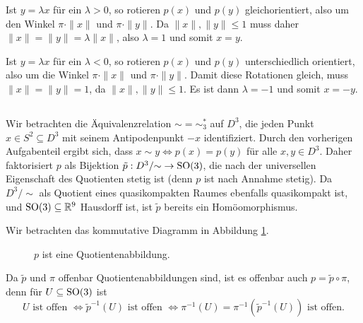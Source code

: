 \documentclass[a4paper,10pt]{article}
\begin{document}
Ist $y = \lambda x$ für ein $\lambda > 0$, so rotieren $p(x)$ und $p(y)$ gleichorientiert, also um den Winkel $\pi \cdot \|x\|$ und $\pi \cdot \|y\|$. Da $\|x\|, \|y\| \leq 1$ muss daher $\|x\| = \|y\| = \lambda \|x\|$, also $\lambda = 1$ und somit $x = y$.

Ist $y = \lambda x$ für ein $\lambda < 0$, so rotieren $p(x)$ und $p(y)$ unterschiedlich orientiert, also um die Winkel $\pi \cdot \|x\|$ und $\pi \cdot \|y\|$. Damit diese Rotationen gleich, muss $\|x\| = \|y\| = 1$, da $\|x\|,\|y\| \leq 1$. Es ist dann $\lambda = -1$ und somit $x = -y$.


\addtocounter{subsection}{-2}
\subsection{}
Wir betrachten die Äquivalenzrelation ${\sim}={\sim^*_3}$ auf $D^3$, die jeden Punkt $x \in S^2 \subseteq D^3$ mit seinem Antipodenpunkt $-x$ identifiziert. Durch den vorherigen Aufgabenteil ergibt sich, dass $x \sim y \Leftrightarrow p(x) = p(y)$ für alle $x,y \in D^3$. Daher faktorisiert $p$ als Bijektion $\tilde{p} : D^3/{\sim} \to \operatorname{SO}(3)$, die nach der universellen Eigenschaft des Quotienten stetig ist (denn $p$ ist nach Annahme stetig). Da $D^3/{\sim}$ als Quotient eines quasikompakten Raumes ebenfalls quasikompakt ist, und $\operatorname{SO}(3) \subseteq \mathbb{R}^9$ Hausdorff ist, ist $\tilde{p}$ bereits ein Homöomorphismus.

Wir betrachten das kommutative Diagramm in Abbildung \ref{fig: p Quotientenabbildung}.
\begin{figure}\centering
 \caption{$p$ ist eine Quotientenabbildung.}
 \label{fig: p Quotientenabbildung}
\end{figure}
Da $\tilde{p}$ und $\pi$ offenbar Quotientenabbildungen sind, ist es offenbar auch $p = \tilde{p} \circ \pi$, denn für $U \subseteq \operatorname{SO}(3)$ ist
\[
 U \text{ ist offen }
 \Leftrightarrow \tilde{p}^{-1}(U) \text{ ist offen }
 \Leftrightarrow \pi^{-1}(U) = \pi^{-1}\left(\tilde{p}^{-1}(U)\right) \text{ ist offen}.
\]


\addtocounter{subsection}{1}
\end{document}
